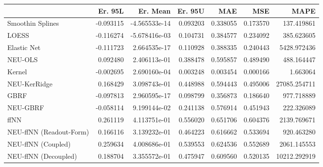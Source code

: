 \begin{tabular}{lrrrrrr}
\toprule
{} &   Er. 95L &      Er. Mean &   Er. 95U &       MAE &       MSE &          MAPE \\
\midrule
Smoothin Splines        & -0.093115 & -4.565533e-14 &  0.093203 &  0.338055 &  0.173570 &    137.419861 \\
LOESS                   & -0.116274 & -5.678416e-03 &  0.104731 &  0.384577 &  0.234092 &    385.623605 \\
Elastic Net             & -0.111723 &  2.664535e-17 &  0.110928 &  0.388335 &  0.240443 &   5428.972436 \\
NEU-OLS                 &  0.092480 &  2.406113e-01 &  0.388478 &  0.595857 &  0.489490 &    488.164447 \\
Kernel                  & -0.002695 &  2.690160e-04 &  0.003248 &  0.003454 &  0.000166 &      1.663064 \\
NEU-KerRidge            &  0.168429 &  3.098743e-01 &  0.448988 &  0.594443 &  0.495006 &  27085.254711 \\
GBRF                    & -0.097813 &  2.960595e-17 &  0.098799 &  0.356873 &  0.186640 &    977.718889 \\
NEU-GBRF                & -0.058114 &  9.199144e-02 &  0.241138 &  0.576914 &  0.451943 &    222.326089 \\
ffNN                    &  0.261119 &  4.113751e-01 &  0.556020 &  0.651706 &  0.604376 &   2139.769671 \\
NEU-ffNN (Readout-Form) &  0.166116 &  3.139232e-01 &  0.464223 &  0.616662 &  0.533694 &    920.463280 \\
NEU-ffNN (Coupled)      &  0.259634 &  4.008686e-01 &  0.539553 &  0.624536 &  0.552689 &   2061.145553 \\
NEU-ffNN (Decoupled)    &  0.188704 &  3.355572e-01 &  0.475947 &  0.609560 &  0.520135 &  10212.292919 \\
\bottomrule
\end{tabular}
